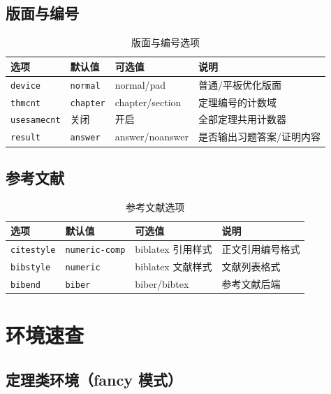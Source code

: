 \subsection{版面与编号}

\begin{table}[htbp]
  \centering
  \caption{版面与编号选项}\label{tab:opt-layout}
  \begin{tabular}{lllp{5.5cm}}
    \toprule
    选项 & 默认值 & 可选值 & 说明 \\
    \midrule
    \texttt{device} & \texttt{normal} & normal/pad & 普通/平板优化版面 \\
    \texttt{thmcnt} & \texttt{chapter} & chapter/section &
      定理编号的计数域 \\
    \texttt{usesamecnt} & 关闭 & 开启 & 全部定理共用计数器 \\
    \texttt{result} & \texttt{answer} & answer/noanswer &
      是否输出习题答案/证明内容 \\
    \bottomrule
  \end{tabular}
\end{table}

\subsection{参考文献}

\begin{table}[htbp]
  \centering
  \caption{参考文献选项}\label{tab:opt-bib}
  \begin{tabular}{lllp{5.5cm}}
    \toprule
    选项 & 默认值 & 可选值 & 说明 \\
    \midrule
    \texttt{citestyle} & \texttt{numeric-comp} & biblatex 引用样式 &
      正文引用编号格式 \\
    \texttt{bibstyle} & \texttt{numeric} & biblatex 文献样式 &
      文献列表格式 \\
    \texttt{bibend} & \texttt{biber} & biber/bibtex & 参考文献后端 \\
    \bottomrule
  \end{tabular}
\end{table}

\section{环境速查}

\subsection{定理类环境（fancy 模式）}


